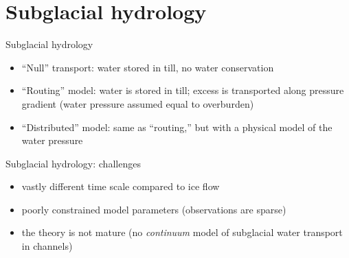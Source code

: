 \documentclass[hide notes,intlimits]{beamer}
\begin{document}
\section{Subglacial hydrology}
\label{sec:subglacial-hydrology}

\begin{frame}{Subglacial hydrology}

  \begin{itemize}
  \item ``Null'' transport: water stored in till, no water conservation
  \item ``Routing'' model: water is stored in till; excess is
    transported along pressure gradient (water pressure assumed equal
    to overburden)
  \item ``Distributed'' model: same as ``routing,'' but with a
    physical model of the water pressure
  \end{itemize}
\end{frame}

\begin{frame}{Subglacial hydrology: challenges}
  \begin{itemize}
  \item vastly different time scale compared to ice flow
  \item poorly constrained model parameters (observations are sparse)
  \item the theory is not mature (no \emph{continuum} model of
    subglacial water transport in channels)
  \end{itemize}
\end{frame}

\end{document}
